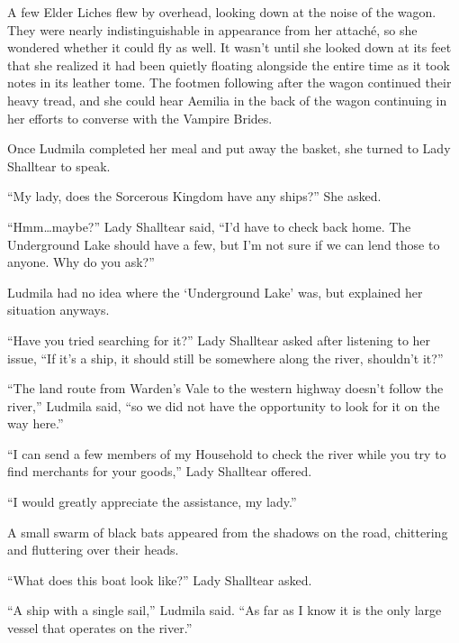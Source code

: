 A few Elder Liches flew by overhead, looking down at the noise of the wagon. They were nearly indistinguishable in appearance from her attaché, so she wondered whether it could fly as well. It wasn’t until she looked down at its feet that she realized it had been quietly floating alongside the entire time as it took notes in its leather tome. The footmen following after the wagon continued their heavy tread, and she could hear Aemilia in the back of the wagon continuing in her efforts to converse with the Vampire Brides.

 

Once Ludmila completed her meal and put away the basket, she turned to Lady Shalltear to speak.

 

“My lady, does the Sorcerous Kingdom have any ships?” She asked.

 

“Hmm…maybe?” Lady Shalltear said, “I’d have to check back home. The Underground Lake should have a few, but I’m not sure if we can lend those to anyone. Why do you ask?”

 

Ludmila had no idea where the ‘Underground Lake’ was, but explained her situation anyways.

 

“Have you tried searching for it?” Lady Shalltear asked after listening to her issue, “If it’s a ship, it should still be somewhere along the river, shouldn’t it?”

 

“The land route from Warden’s Vale to the western highway doesn’t follow the river,” Ludmila said, “so we did not have the opportunity to look for it on the way here.”

 

“I can send a few members of my Household to check the river while you try to find merchants for your goods,” Lady Shalltear offered.

 

“I would greatly appreciate the assistance, my lady.”

 

A small swarm of black bats appeared from the shadows on the road, chittering and fluttering over their heads.

 

“What does this boat look like?” Lady Shalltear asked.

 

“A ship with a single sail,” Ludmila said. “As far as I know it is the only large vessel that operates on the river.”

